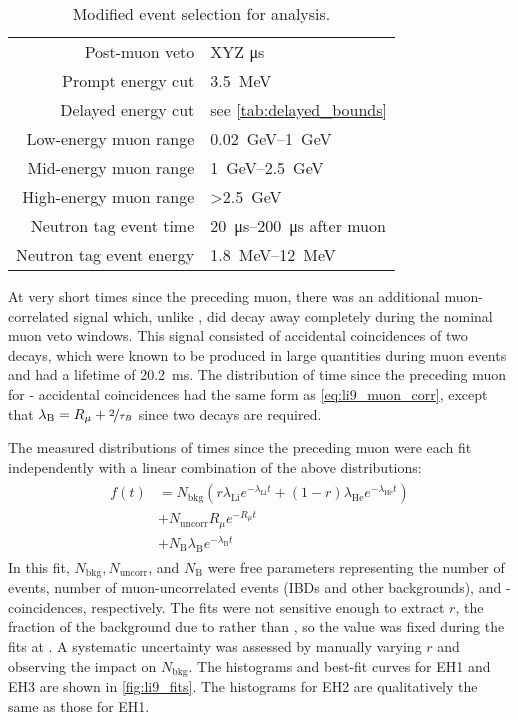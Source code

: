 \begin{table}
    \centering
    \caption{Modified event selection for \li{} analysis.}
    \label{tab:li9}
    \begin{tabular}[t]{rl}
        \hline
        Post-muon veto & XYZ \si{\us} \\
        Prompt energy cut & \SI{3.5}{\MeV} \\
        Delayed energy cut & see \cref{tab:delayed_bounds} \\
        \hline
        Low-energy muon range & \SIrange{0.02}{1}{\GeV} \\
        Mid-energy muon range & \SIrange{1}{2.5}{\GeV} \\
        High-energy muon range & \SI{>2.5}{\GeV} \\
        \hline
        Neutron tag event time & \SIrange{20}{200}{\us} after muon \\
        Neutron tag event energy & \SIrange{1.8}{12}{\MeV} \\
        \hline
    \end{tabular}
\end{table}

At very short times since the preceding muon,
there was an additional muon-correlated signal
which, unlike \li{}, did decay away completely
during the nominal muon veto windows.
This signal consisted of accidental coincidences
of two \boron{} decays,
which were known to be produced in large quantities
during muon events \cite{kamland_li9}
and had a lifetime of \SI{20.2}{\ms}.
The distribution of time since the preceding muon
for \boron{}-\boron{} accidental coincidences
had the same form as \cref{eq:li9_muon_corr},
except that $\lambda_\text{B} = R_\mu + \nicefrac{2}{\tau_{B}}$
since two \boron{} decays are required.

The measured distributions of times since the preceding muon
were each fit independently with a linear combination of the above distributions:
\begin{align}\label{eq:li9_fit_fn}
    \begin{split}
        f(t) &= N_\text{bkg} (r \lambda_\text{Li} e^{-\lambda_\text{Li} t}
        + (1-r) \lambda_\text{He} e^{-\lambda_\text{He} t}) \\
             &+ N_\text{uncorr} R_\mu e^{-R_\mu t} \\
             &+ N_\text{B} \lambda_\text{B} e^{-\lambda_\text{B} t}
    \end{split}
\end{align}
In this fit, $N_\text{bkg}, N_\text{uncorr}$, and $N_\text{B}$
were free parameters representing the number of \li{} events,
number of muon-uncorrelated events (IBDs and other backgrounds),
and \boron{}-\boron{} coincidences, respectively.
The fits were not sensitive enough to extract $r$,
the fraction of the background due to \li{} rather than \he{},
so the value was fixed during the fits at .
A systematic uncertainty was assessed by manually varying $r$
and observing the impact on $N_\text{bkg}$.
The histograms and best-fit curves for EH1 and EH3 are shown
in \cref{fig:li9_fits}.
The histograms for EH2 are qualitatively the same as those for EH1.

